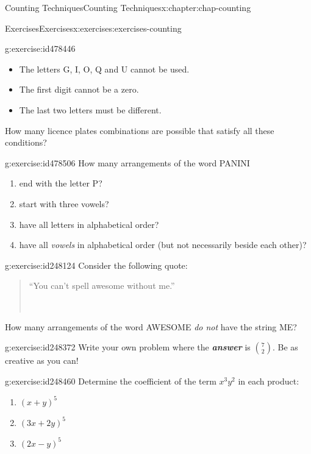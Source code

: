 \documentclass[oneside,10pt,]{book}
\newcommand{\alert}[1]{\textbf{\textit{#1}}}
\numberwithin{equation}{section}
\begin{document}
\begin{chapterptx}{Counting Techniques}{}{Counting Techniques}{}{}{x:chapter:chap-counting}
\begin{exercises-section}{Exercises}{}{Exercises}{}{}{x:exercises:exercises-counting}
\begin{divisionexercise}{3}{}{}{g:exercise:id478446}
\begin{itemize}[label=\textbullet]
\item{}The letters G, I, O, Q and U cannot be used.%
\item{}The first digit cannot be a zero.%
\item{}The last two letters must be different.%
\end{itemize}
How many licence plates combinations are possible that satisfy all these conditions?%
\end{divisionexercise}%
\begin{divisionexercise}{4}{}{}{g:exercise:id478506}%
How many arrangements of the word PANINI%
\begin{enumerate}[label=(\alph*)]
\item{}end with the letter P?%
\item{}start with three vowels?%
\item{}have all letters in alphabetical order?%
\item{}have all \emph{vowels} in alphabetical order (but not necessarily beside each other)?%
\end{enumerate}
%
\end{divisionexercise}%
\begin{divisionexercise}{5}{}{}{g:exercise:id248124}%
Consider the following quote:%
\begin{quote}%
``You can't spell awesome without me.''%
\nopagebreak\par%
\hfill{}\\\par
\end{quote}
How many arrangements of the word AWESOME \emph{do not} have the string ME?%
\end{divisionexercise}%
\begin{divisionexercise}{6}{}{}{g:exercise:id248372}%
Write your own problem where the \alert{answer} is \(\displaystyle\binom{7}{2}\). Be as creative as you can!%
\end{divisionexercise}%
\begin{divisionexercise}{7}{}{}{g:exercise:id248460}%
Determine the coefficient of the term \(x^3y^2\) in each product:%
\begin{enumerate}[label=(\alph*)]
\item{}\(\displaystyle (x+y)^5\)%
\item{}\(\displaystyle (3x+2y)^5\)%
\item{}\(\displaystyle (2x-y)^5\)%

\end{enumerate}
\end{divisionexercise}
\end{exercises-section}
\end{chapterptx}
\end{document}

